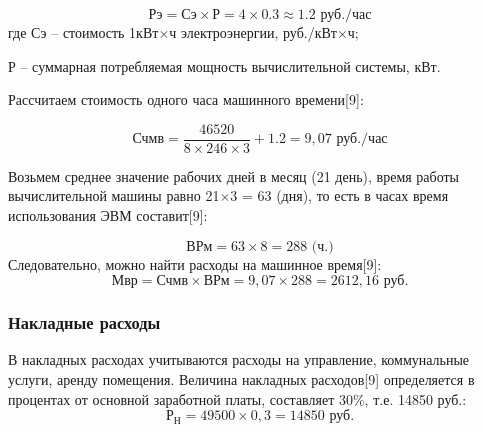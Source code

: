 \documentclass[a4paper]{extarticle}
\numberwithin{equation}{section}
\begin{document}
\begin{equation}
\label{form8}
	\text{Рэ}=\text{Сэ}\times \text{Р}=4\times 0.3\approx 1.2 \text{ руб./час}
\end{equation}
где Сэ – стоимость 1кВт$\times$ч электроэнергии, руб./кВт$\times$ч;\par
Р – суммарная потребляемая мощность вычислительной системы, кВт.\par
Рассчитаем стоимость одного часа машинного времени[9]:\par
\begin{equation}
\label{form9}
	\text{Счмв}=\frac{46520}{8\times 246\times 3}+1.2 = 9,07\text{ руб./час}
\end{equation}\par
Возьмем среднее значение рабочих дней в месяц (21 день), время работы вычислительной машины равно 21$\times$3 = 63 (дня), то есть в часах время использования ЭВМ составит[9]:\par
\begin{equation}
\label{form10}
	\text{ВРм}=63\times 8=288\text{ (ч.)}
\end{equation}
Следовательно, можно найти расходы на машинное время[9]:
\begin{equation}
\label{form11}
	\text{Мвр}=\text{Счмв}\times\text{ВРм}=9,07\times 288 = 2612,16\text{ руб.}
\end{equation}
\subsubsection{Накладные расходы}
В накладных расходах учитываются расходы на управление, коммунальные услуги, аренду помещения. Величина накладных расходов[9] определяется в процентах от основной заработной платы, составляет 30\%, т.е. 14850 руб.:
\begin{equation}
\label{form12}
	\text{Р}_\text{Н}=49500\times 0,3=14850\text{ руб.}
\end{equation}
\end{document}
